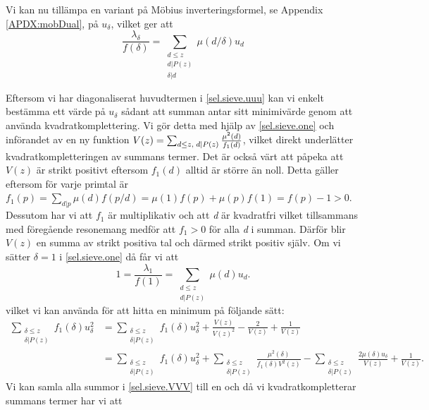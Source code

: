 Vi kan nu tillämpa en variant på Möbius inverteringsformel, se Appendix \ref{APDX:mobDual}, på \(u_\delta\), vilket ger att
\begin{equation}
    \frac{\lambda_\delta}{f(\delta)} = \sum_{\substack{d\leq z\\d|P(z)\\\delta|d}} \mu(d/\delta)u_d \label{sel.sieve.one}
\end{equation}

Eftersom vi har diagonaliserat huvudtermen i \eqref{sel.sieve.uuu} kan vi enkelt bestämma ett värde på \(u_\delta\) sådant att summan antar sitt minimivärde genom att använda kvadratkomplettering. 
Vi gör detta med hjälp av \eqref{sel.sieve.one} och införandet av en ny funktion \(V(z) = \sum_{d\leq z,\; d\mid P(z)}\frac{\mu^2(d)}{f_1(d)}\), vilket direkt underlätter kvadratkompletteringen av summans termer. 
Det är också värt att påpeka att \(V(z)\) är strikt positivt eftersom \(f_1(d)\) alltid är större än noll. 
Detta gäller eftersom för varje primtal är \(f_1(p) = \sum_{d|p}\mu(d)f({p}/{d}) = \mu(1)f(p) + \mu(p)f(1) = f(p) - 1 > 0\).
Dessutom har vi att \(f_1\) är multiplikativ och att \textit{d} är kvadratfri vilket tillsammans med föregående resonemang medför att \(f_1 > 0\) för alla \textit{d} i summan. 
Därför blir \(V(z)\) en summa av strikt positiva tal och därmed strikt positiv själv.
Om vi sätter \(\delta = 1\) i \eqref{sel.sieve.one} då får vi att
\begin{equation}
    1 = \frac{\lambda_1}{f(1)} = \sum_{\substack{d\leq z\\ d|P(z)}}\mu(d)u_d.\nonumber
\end{equation}
vilket vi kan använda för att hitta en minimum på följande sätt:
\begin{align}
    \sum_{\substack{\delta \leq z\\ \delta | P(z)}}f_1(\delta) u_\delta^2 &= \sum_{\substack{\delta\leq z\\\delta|P(z)}} f_1(\delta)u_\delta^2 + \frac{V(z)}{V(z)^2} - \frac{2}{V(z)} + \frac{1}{V(z)}\nonumber\\
    &= \sum_{\substack{\delta\leq z\\\delta|P(z)}} f_1(\delta)u_\delta^2 + \sum_{\substack{\delta\leq z\\ \delta|P(z)}}\frac{\mu^2(\delta)}{f_1(\delta)V^2(z)} - \sum_{\substack{\delta\leq z\\\delta |P(z)}}\frac{2\mu(\delta)u_\delta}{V(z)} + \frac{1}{V(z)}.\label{sel.sieve.VVV}
\end{align}
Vi kan samla alla summor i \eqref{sel.sieve.VVV} till en och då vi kvadratkompletterar summans termer har vi att
